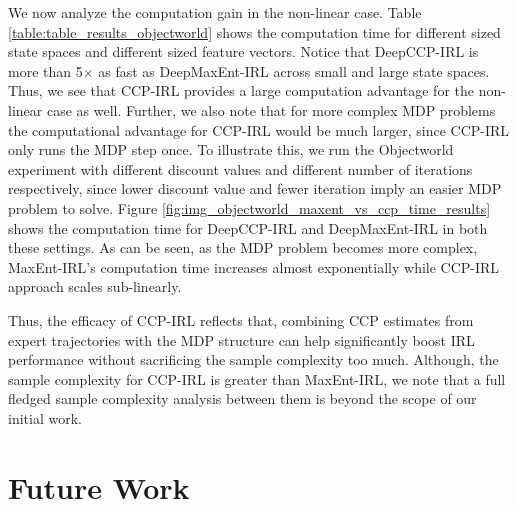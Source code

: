 \documentclass{article}
\begin{document}

We now analyze the computation gain in the non-linear case. Table \ref{table:table_results_objectworld} shows the computation time for different sized state spaces and different sized feature vectors. Notice that DeepCCP-IRL is more than 5$\times$ as fast as DeepMaxEnt-IRL across small and large state spaces. Thus, we see that CCP-IRL provides a large computation advantage for the non-linear case as well. Further, we also note that for more complex MDP problems the computational advantage for CCP-IRL would be much larger, since CCP-IRL only runs the MDP step once. To illustrate this, we run the Objectworld experiment with different discount values and different number of iterations respectively, since lower discount value and fewer iteration imply an easier MDP problem to solve. Figure \ref{fig:img_objectworld_maxent_vs_ccp_time_results} shows the computation time for DeepCCP-IRL and DeepMaxEnt-IRL in both these settings. As can be seen, as the MDP problem becomes more complex, MaxEnt-IRL's computation time increases almost exponentially while CCP-IRL approach scales sub-linearly.

Thus, the efficacy of CCP-IRL reflects that, combining CCP estimates from expert trajectories with the MDP structure can help significantly boost IRL performance without sacrificing the sample complexity too much. Although, the sample complexity for CCP-IRL is greater than MaxEnt-IRL, we note that a full fledged sample complexity analysis between them is beyond the scope of our initial work.



\section{Future Work}

\end{document}
